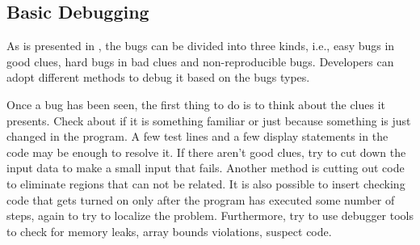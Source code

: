 \documentclass[draftclsnofoot,journal,onecolumn,12pt]{IEEEtran}
\begin{document}
\subsection{Basic Debugging}

As is presented in \cite{kernighan1999practice}, the bugs can be divided into three kinds, i.e., easy bugs in good clues, hard bugs in bad clues and non-reproducible bugs. Developers can adopt different methods to debug it based on the bugs types.

Once a bug has been seen, the first thing to do is to think about the clues it presents. Check about if it is something familiar or just because something is just changed in the program. A few test lines and a few display statements in the code may be enough to resolve it. If there aren't good clues, try to cut down the input data to make a small input that fails. Another method is cutting out code to eliminate regions that can not be related. It is also possible to insert checking code that gets turned on only after the program has executed some number of steps, again to try to localize the problem. Furthermore, try to use debugger tools to check for memory leaks, array bounds violations, suspect code.
\end{document}
